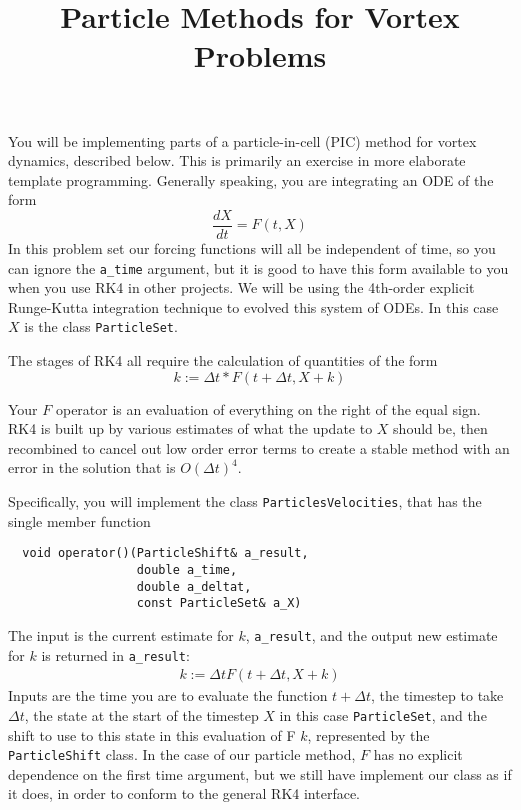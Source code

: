 \documentclass[11pt]{article}
\title{Particle Methods for Vortex Problems}
\begin{document}
\maketitle

\noindent

You will be implementing parts of a particle-in-cell (PIC) method for vortex dynamics, described below. This is primarily an exercise in more elaborate template programming. Generally speaking, you are integrating an ODE of the form
\begin{equation}
\frac{dX}{dt} = F(t, X)
\end{equation}
In this problem set our forcing functions will all be independent of time, so you can ignore the {\tt a\_time} argument, but it is good to have this form available to you when you use RK4 in other projects.
We will be using the 4th-order explicit Runge-Kutta integration technique to evolved this system of ODEs. In this case $X$ is the class {\tt ParticleSet}. 

The stages of RK4 all require the calculation of quantities of the form
\begin{equation}
k := \Delta t * F(t+\Delta t, X+ k)
\end{equation}

Your $F$ operator is an evaluation of everything on the right of the equal sign.  RK4 is built up by various estimates of what the update to $X$ should be, then recombined to cancel out low order error terms to create a stable method with an error in the solution that is $O(\Delta t)^4$.
 
Specifically, you will implement the class {\tt ParticlesVelocities}, that has the single member function 
\begin{verbatim}
  void operator()(ParticleShift& a_result, 
                  double a_time, 
                  double a_deltat, 
                  const ParticleSet& a_X)
\end{verbatim}

The input is the current estimate for $k$, {\tt a\_result}, and the output new estimate for $k$ is returned in {\tt a\_result}:
\begin{gather*}
k := \Delta t F(t + \Delta t,X + k)
\end{gather*}
 Inputs are the time you are to evaluate the function $t+\Delta t$, the timestep to take $\Delta t$, the state at the start of the timestep $X$ in this case {\tt ParticleSet}, and the shift to use to this state in this evaluation of F $k$, represented by the {\tt ParticleShift} class. In the case of our particle method, $F$ has no explicit dependence on the first time argument, but we still have implement our class as if it does, in order to conform to the general RK4 interface.
\end{document}

